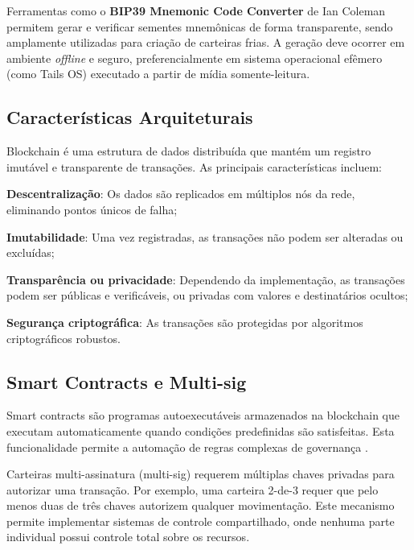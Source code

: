 Ferramentas como o \textbf{BIP39 Mnemonic Code Converter} de Ian Coleman \cite{coleman2015} permitem gerar e verificar sementes mnemônicas de forma transparente, sendo amplamente utilizadas para criação de carteiras frias. A geração deve ocorrer em ambiente \textit{offline} e seguro, preferencialmente em sistema operacional efêmero (como Tails OS) executado a partir de mídia somente-leitura.

\subsection{Características Arquiteturais}

Blockchain é uma estrutura de dados distribuída que mantém um registro imutável e transparente de transações. As principais características incluem:

\begin{alineas}
    \item \textbf{Descentralização}: Os dados são replicados em múltiplos nós da rede, eliminando pontos únicos de falha;
    \item \textbf{Imutabilidade}: Uma vez registradas, as transações não podem ser alteradas ou excluídas;
    \item \textbf{Transparência ou privacidade}: Dependendo da implementação, as transações podem ser públicas e verificáveis, ou privadas com valores e destinatários ocultos;
    \item \textbf{Segurança criptográfica}: As transações são protegidas por algoritmos criptográficos robustos.
\end{alineas}

\subsection{Smart Contracts e Multi-sig}

Smart contracts são programas autoexecutáveis armazenados na blockchain que executam automaticamente quando condições predefinidas são satisfeitas. Esta funcionalidade permite a automação de regras complexas de governança \cite{buterin2014}.

Carteiras multi-assinatura (multi-sig) requerem múltiplas chaves privadas para autorizar uma transação. Por exemplo, uma carteira 2-de-3 requer que pelo menos duas de três chaves autorizem qualquer movimentação. Este mecanismo permite implementar sistemas de controle compartilhado, onde nenhuma parte individual possui controle total sobre os recursos.

